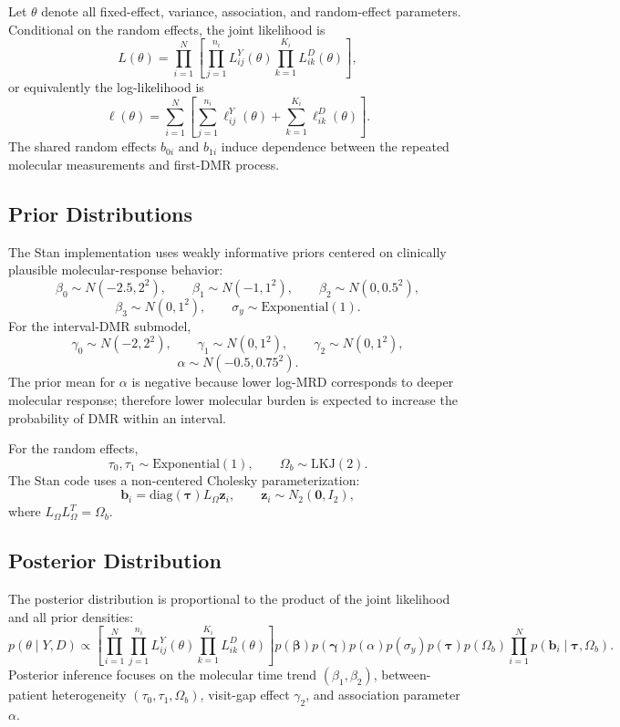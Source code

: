 Let \(\theta\) denote all fixed-effect, variance, association, and random-effect parameters. Conditional on the random effects, the joint likelihood is
\[
L(\theta)
=
\prod_{i=1}^{N}
\left[
\prod_{j=1}^{n_i} L^{Y}_{ij}(\theta)
\prod_{k=1}^{K_i} L^{D}_{ik}(\theta)
\right],
\]
or equivalently the log-likelihood is
\[
\ell(\theta)
=
\sum_{i=1}^{N}
\left[
\sum_{j=1}^{n_i}\ell^{Y}_{ij}(\theta)
+\sum_{k=1}^{K_i}\ell^{D}_{ik}(\theta)
\right].
\]
The shared random effects \(b_{0i}\) and \(b_{1i}\) induce dependence between the repeated molecular measurements and first-DMR process.

\subsection{Prior Distributions}

The Stan implementation uses weakly informative priors centered on clinically plausible molecular-response behavior:
\[
\beta_0\sim N(-2.5,2^2), \qquad
\beta_1\sim N(-1,1^2), \qquad
\beta_2\sim N(0,0.5^2),
\]
\[
\beta_3\sim N(0,1^2), \qquad
\sigma_y\sim \mathrm{Exponential}(1).
\]
For the interval-DMR submodel,
\[
\gamma_0\sim N(-2,2^2), \qquad
\gamma_1\sim N(0,1^2), \qquad
\gamma_2\sim N(0,1^2),
\]
\[
\alpha\sim N(-0.5,0.75^2).
\]
The prior mean for \(\alpha\) is negative because lower log-MRD corresponds to deeper molecular response; therefore lower molecular burden is expected to increase the probability of DMR within an interval.

For the random effects,
\[
\tau_0,\tau_1\sim \mathrm{Exponential}(1), \qquad
\Omega_b\sim \mathrm{LKJ}(2).
\]
The Stan code uses a non-centered Cholesky parameterization:
\[
\mathbf{b}_i = \mathrm{diag}(\boldsymbol{\tau})L_{\Omega}\mathbf{z}_i,
\qquad
\mathbf{z}_i\sim N_2(\mathbf{0},I_2),
\]
where \(L_{\Omega}L_{\Omega}^{T}=\Omega_b\).

\subsection{Posterior Distribution}

The posterior distribution is proportional to the product of the joint likelihood and all prior densities:
\[
p(\theta\mid Y,D)
\propto
\left[
\prod_{i=1}^{N}
\prod_{j=1}^{n_i} L^{Y}_{ij}(\theta)
\prod_{k=1}^{K_i} L^{D}_{ik}(\theta)
\right]
p(\boldsymbol{\beta})p(\boldsymbol{\gamma})p(\alpha)
p(\sigma_y)p(\boldsymbol{\tau})p(\Omega_b)
\prod_{i=1}^{N}p(\mathbf{b}_i\mid\boldsymbol{\tau},\Omega_b).
\]
Posterior inference focuses on the molecular time trend \((\beta_1,\beta_2)\), between-patient heterogeneity \((\tau_0,\tau_1,\Omega_b)\), visit-gap effect \(\gamma_2\), and association parameter \(\alpha\).

